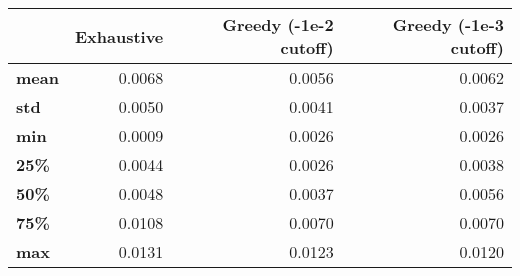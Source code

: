 \begin{tabular}{lrrr}
\toprule
{} &  Exhaustive &  Greedy (-1e-2 cutoff) &  Greedy (-1e-3 cutoff) \\
\midrule
\textbf{mean} &      0.0068 &                 0.0056 &                 0.0062 \\
\textbf{std } &      0.0050 &                 0.0041 &                 0.0037 \\
\textbf{min } &      0.0009 &                 0.0026 &                 0.0026 \\
\textbf{25\% } &      0.0044 &                 0.0026 &                 0.0038 \\
\textbf{50\% } &      0.0048 &                 0.0037 &                 0.0056 \\
\textbf{75\% } &      0.0108 &                 0.0070 &                 0.0070 \\
\textbf{max } &      0.0131 &                 0.0123 &                 0.0120 \\
\bottomrule
\end{tabular}
